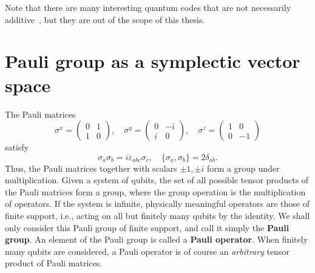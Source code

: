 Note that there are many interesting quantum codes that are not necessarily additive~\cite{
RainsHardinShorSloane1997Nonadditive,
Kitaev2003Fault-tolerant,
LevinWen2005String-net},
but they are out of the scope of this thesis.

\section{Pauli group as a symplectic vector space}
\label{sec:pauli-group-symplectic-vector-space}

The Pauli matrices
\[
 \sigma^x = \begin{pmatrix} 0 & 1 \\ 1 & 0 \end{pmatrix}, \quad
 \sigma^y = \begin{pmatrix} 0 & -i \\ i & 0 \end{pmatrix}, \quad
 \sigma^z = \begin{pmatrix} 1 & 0 \\ 0 & -1 \end{pmatrix}
\]
satisfy
\[
 \sigma_a \sigma_b = i \varepsilon_{abc} \sigma_c, \quad
 \{ \sigma_a , \sigma_b \} = 2 \delta_{ab}.
\]
Thus, the Pauli matrices together with scalars $\pm 1, \pm i$
form a group under multiplication.
Given a system of qubits,
the set of all possible tensor products of the Pauli matrices form a group,
where the group operation is the multiplication of operators.
If the system is infinite, physically meaningful operators
are those of finite support, i.e.,
acting on all but finitely many qubits by the identity.
We shall only consider this Pauli group of finite support,
and call it simply the {\bf Pauli group}.
An element of the Pauli group is called a {\bf Pauli operator}.
When finitely many qubits are considered,
a Pauli operator is of course an \emph{arbitrary} tensor product of Pauli matrices.


